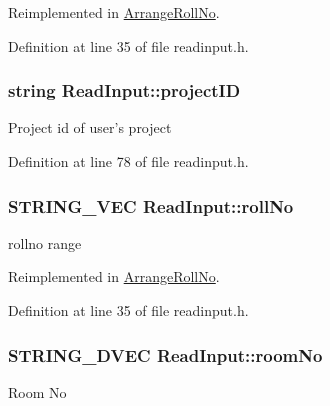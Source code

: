 \-Reimplemented in \hyperlink{classArrangeRollNo_ac70b1f6e601cc5786ef339a38ae18c6f}{\-Arrange\-Roll\-No}.



\-Definition at line 35 of file readinput.\-h.

\hypertarget{classReadInput_a3ad470a25b3e0a29466bf4ff1f7d8e81}{
\subsubsection[{project\-I\-D}]{\setlength{\rightskip}{0pt plus 5cm}string {\bf \-Read\-Input\-::project\-I\-D}}}\label{de/d50/classReadInput_a3ad470a25b3e0a29466bf4ff1f7d8e81}
\-Project id of user's project 

\-Definition at line 78 of file readinput.\-h.

\hypertarget{classReadInput_a862fbffdffa56fc6d66b1d1f14dae087}{
\subsubsection[{roll\-No}]{\setlength{\rightskip}{0pt plus 5cm}\-S\-T\-R\-I\-N\-G\-\_\-\-V\-E\-C {\bf \-Read\-Input\-::roll\-No}}}\label{de/d50/classReadInput_a862fbffdffa56fc6d66b1d1f14dae087}
rollno range 

\-Reimplemented in \hyperlink{classArrangeRollNo_ad75d3ee3f709606da5b4871098c3e978}{\-Arrange\-Roll\-No}.



\-Definition at line 35 of file readinput.\-h.

\hypertarget{classReadInput_a77f996670554c8a752e7cbd713ecb084}{
\subsubsection[{room\-No}]{\setlength{\rightskip}{0pt plus 5cm}\-S\-T\-R\-I\-N\-G\-\_\-D\-V\-E\-C {\bf \-Read\-Input\-::room\-No}}}\label{de/d50/classReadInput_a77f996670554c8a752e7cbd713ecb084}
\-Room \-No 

